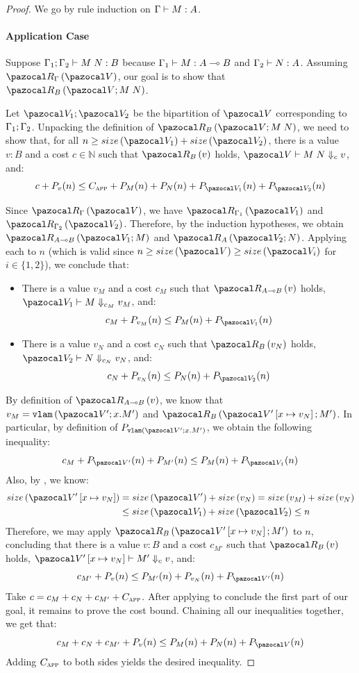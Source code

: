 \begin{proof}
We go by rule induction on $\Gamma \vdash M : A$.

\paragraph{Application Case}
Suppose $\types{\ctxappend{\ctx_1}{\ctx_2}}{\tmapp{M}{N}}{B}$ because $\types{\ctx_1}{M}{\tparr{A}{B}}$ and $\Gamma_2 \vdash N : A$. Assuming $\Renv{\Gamma}{\env}$, our goal is to show that $\Rterm{B}{\env}{\tmapp{M}{N}}$.

Let $\envappend{\env_1}{\env_2}$ be the bipartition of $\env$ corresponding to $\Gamma_1 ; \Gamma_2$. Unpacking the definition of $\Rterm{B}{\env}{\tmapp{M}{N}}$, we need to show that, for all $n \ge \envsize{\env_1} + \envsize{\env_2}$, there is a value $v : B$ and a cost $c \in \mathbb N$ such that $\Rval{B}{v}$ holds, $\evals{\env}{\tmapp{M}{N}}{c}{v}$, and:
\[ c + P_v(n) \le \Capp + P_M(n) + P_N(n) + P_{\env_1}(n) + P_{\env_2}(n) \]

Since $\Renv{\Gamma}{\env}$, we have $\Renv{\Gamma_1}{\env_1}$ and $\Renv{\Gamma_2}{\env_2}$. Therefore, by the induction hypotheses, we obtain $\Rterm{\tparr{A}{B}}{\env_1}{M}$ and $\Rterm{A}{\env_2}{N}$. Applying each to $n$ (which is valid since $n \ge \envsize{\env} \ge \envsize{\env_i}$ for $i \in \{1,2\}$), we conclude that:
\begin{itemize}
  \item There is a value $v_M$ and a cost $c_M$ such that $\Rval{\tparr{A}{B}}{v}$ holds, $\evals{\env_1}{M}{c_M}{v_M}$, and:
  \[ c_M + P_{v_M}(n) \le P_M(n) + P_{\env_1}(n) \]
  \item There is a value $v_N$ and a cost $c_N$ such that $\Rval{B}{v_N}$ holds, $\evals{\env_2}{N}{c_N}{v_N}$, and:
  \[ c_N + P_{v_N}(n) \le P_N(n) + P_{\env_2}(n) \]
\end{itemize}

By definition of $\Rval{\tparr{A}{B}}{v}$, we know that $v_M = \vlam{\env'}{x}{M'}$ and $\Rterm{B}{\envcons{\env'}{x}{v_N}}{M'}$. In particular, by definition of $P_{\vlam{\env'}{x}{M'}}$, we obtain the following inequality:
\[ c_M + P_{\env'}(n) + P_{M'}(n) \le P_M(n) + P_{\env_1}(n) \]
Also, by , we know:
\begin{align*}
\envsize{\envcons{\env'}{x}{v_N}} &= \envsize{\env'} + \valsize{v_N} = \envsize{v_M} + \valsize{v_N} \\
&\le \envsize{\env_1} + \envsize{\env_2} \le n
\end{align*}
Therefore, we may apply $\Rterm{B}{\envcons{\env'}{x}{v_N}}{M'}$ to $n$, concluding that there is a value $v : B$ and a cost $c_{M'}$ such that $\Rval{B}{v}$ holds, $\evals{\envcons{\env'}{x}{v_N}}{M'}{c}{v}$, and:
\[ c_{M'} + P_v(n) \le P_{M'}(n) + P_{v_N}(n) + P_{\env'}(n) \]
Take $c = c_M + c_N + c_{M'} + C_{\textsc{app}}$. After applying  to conclude the first part of our goal, it remains to prove the cost bound. Chaining all our inequalities together, we get that:
\[ c_M + c_N + c_{M'} + P_v(n) \le P_M(n) + P_N(n) + P_{\env}(n) \]
Adding $C_{\textsc{app}}$ to both sides yields the desired inequality.


\end{proof}
